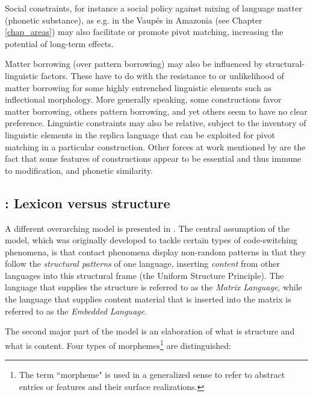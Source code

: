 \documentclass[output=paper]{langscibook}
\begin{document}
Social constraints, for instance a social policy against mixing of language matter (phonetic substance), as e.g. in the Vaupés in Amazonia (see Chapter \ref{chap_areas}) may also facilitate or promote pivot matching, increasing the potential of long-term effects.


Matter borrowing (over pattern borrowing) may also be influenced by struc\-tur\-al-lin\-guis\-tic factors. These have to do with the resistance to or unlikelihood of matter borrowing for some highly entrenched linguistic elements such as inflectional morphology. More generally speaking, some constructions favor matter borrowing, others pattern borrowing, and yet others seem to have no clear preference. Linguistic constraints may also be relative, subject to the inventory of linguistic elements in the replica language that can be exploited for pivot matching in a particular construction. Other forces at work mentioned by \textcite{matras&sakel2007} are the fact that some features of constructions appear to be essential and thus immune to modification, and phonetic similarity.\\

\subsection{\citet{myersetal2009universal}: Lexicon versus structure}

A different overarching model is presented in \textcite{myersetal2009universal}. The central assumption of the model, which was originally developed to tackle certain types of code-switching phenomena, is that contact phenomena display non-random patterns in that they follow the \emph{structural patterns} of one language, inserting \emph{content} from other languages into this structural frame (the Uniform Structure Principle). The language that supplies the structure is referred to as the \emph{Matrix Language}, while the language that supplies content material that is inserted into the matrix is referred to as the \emph{Embedded Language}.

The second major part of the model is an elaboration of what is structure and what is content. Four types of morphemes\footnote{The term ``morpheme" is used in a generalized sense to refer to abstract entries or features and their surface realizations.} are distinguished: 
\end{document}

